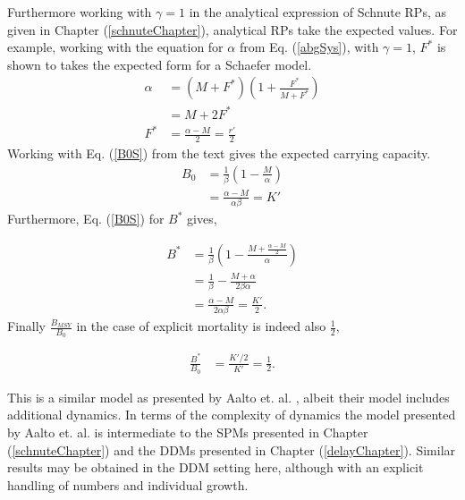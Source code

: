 %
Furthermore working with $\gamma=1$ in the analytical expression of Schnute RPs, 
as given in Chapter (\ref{schnuteChapter}), analytical RPs take the expected 
values. For example, working with the equation for $\alpha$ from Eq. (\ref{abgSys}), 
with $\gamma=1$, $F^*$ is shown to takes the expected form for a Schaefer model.
\begin{align}
\alpha &= (M+F^*)\left(1+\frac{F^*}{M+F^*}\right) \nonumber\\
       &= M+2F^* \nonumber\\
   F^* &= \frac{\alpha-M}{2} = \frac{r'}{2} 
\end{align}
Working with Eq. (\ref{B0S}) from the text gives the expected carrying capacity.
\begin{align}
B_0 &= \frac{1}{\beta} \left( 1-\frac{M}{\alpha} \right) \nonumber\\
    &= \frac{\alpha-M}{\alpha\beta} = K'
\end{align}
Furthermore, Eq. (\ref{B0S}) for $B^*$ gives,

\begin{align}
    B^* &= \frac{1}{\beta} \left( 1-\frac{M+\frac{\alpha-M}{2}}{\alpha}\right) \nonumber\\
        &= \frac{1}{\beta} - \frac{M+\alpha}{2\beta\alpha}\nonumber\\
        &= \frac{\alpha-M}{2\alpha\beta} = \frac{K'}{2}.
\end{align}
%
Finally $\frac{B_{MSY}}{B_0}$ in the case of explicit mortality is indeed also $\frac{1}{2}$,

\begin{align}
\frac{B^*}{B_0}&=\frac{K'/2}{K'}=\frac{1}{2}.
\end{align}

%
This is a similar model as presented by Aalto et. al. \cite{aalto_separating_2015}, 
albeit their model includes additional dynamics. In terms of the complexity of 
dynamics the model presented by Aalto et. al. is intermediate to the SPMs 
presented in Chapter (\ref{schnuteChapter}) and the DDMs presented in 
Chapter (\ref{delayChapter}). Similar results may be obtained in the DDM 
setting here, although with an explicit handling of numbers and individual 
growth.  
